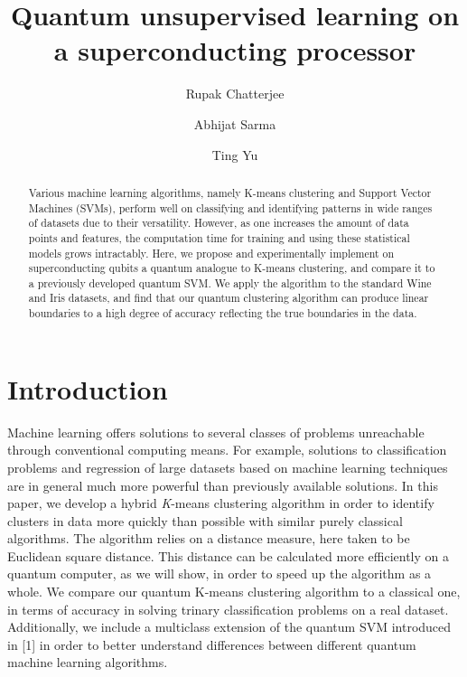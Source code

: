 \documentclass[twocolumn, english]{revtex4-2}
\begin{document}
\title{Quantum unsupervised learning on a superconducting processor}
\author{Rupak Chatterjee}
\author{Abhijat Sarma}
\author{Ting Yu}
\begin{abstract}
Various machine learning algorithms, namely K-means clustering and Support Vector Machines (SVMs), perform well on classifying and identifying patterns in wide ranges of datasets due to their versatility. However, as one increases the amount of data points and features, the computation time for training and using these statistical models grows intractably. Here, we propose and experimentally implement on superconducting qubits a quantum analogue to K-means clustering, and compare it to a previously developed quantum SVM. We apply the algorithm to the standard Wine and Iris datasets, and find that our quantum clustering algorithm can produce linear boundaries to a high degree of accuracy reflecting the true boundaries in the data.
\end{abstract}
\maketitle

\section{Introduction}
Machine learning offers solutions to several classes of problems unreachable through conventional computing means. For example, solutions to classification problems and regression of large datasets based on machine learning techniques are in general much more powerful than previously available solutions. In this paper, we develop a hybrid \textit{K}-means clustering algorithm in order to identify clusters in data more quickly than possible with similar purely classical algorithms. The algorithm relies on a distance measure, here taken to be Euclidean square distance. This distance can be calculated more efficiently on a quantum computer, as we will show, in order to speed up the algorithm as a whole. We compare our quantum K-means clustering algorithm to a classical one, in terms of accuracy in solving trinary classification problems on a real dataset. Additionally, we include a multiclass extension of the quantum SVM introduced in [1] in order to better understand differences between different quantum machine learning algorithms.
\end{document}
